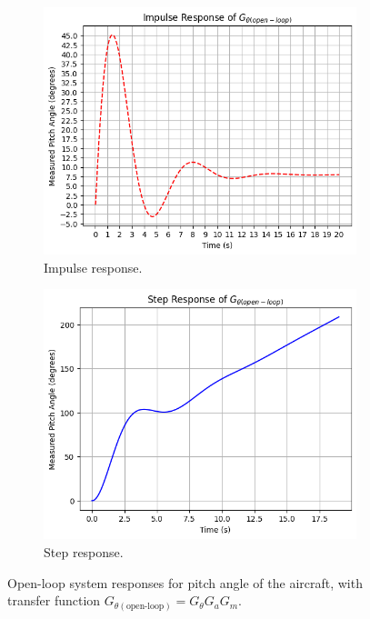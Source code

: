 \documentclass[9pt,a4paper]{article}
\begin{document}
    
    \begin{figure}
    \centering
        \begin{subfigure}[h]{0.35\textwidth}
            \centering
            \includegraphics[width = \textwidth]{figs/GthetaImpRes.png}
            \caption{Impulse response.}
            \label{fig:gThetaImpRes}
        \end{subfigure}%
        \begin{subfigure}[h]{0.35\textwidth}
            \centering
            \includegraphics[width = \textwidth]{figs/GthetaStepRes.png}
            \caption{Step response.}
            \label{fig:gThetaStepRes}
        \end{subfigure}
    \caption{Open-loop system responses for pitch angle of the aircraft, with transfer function $G_{\theta(\text{open-loop})}=G_{\theta}G_{a}G_{m}$.}
    \end{figure}
\end{document}
